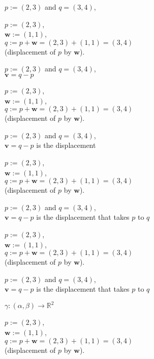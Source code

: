 \documentclass[twocolumn,20pt,fleqn]{extarticle}
\newcommand{\sep}{\vspace{0.5cm}}
\theoremstyle{plain}
\theoremstyle{definition}
\theoremstyle{remark}
\begin{document}
\sep
$p := (2,3)$ and $q=(3,4)$,


\clearpage



$p := (2,3)$,\\ $\mathbf{w} := (1,1)$,\\ $q:=p + \mathbf{w} = (2,3) + (1,1) = (3,4)$ \\ (displacement of $p$ by $\mathbf{w}$).

\sep
$p := (2,3)$ and $q=(3,4)$,\\
$\mathbf{v}= q - p$


\clearpage



$p := (2,3)$,\\ $\mathbf{w} := (1,1)$,\\ $q:=p + \mathbf{w} = (2,3) + (1,1) = (3,4)$ \\ (displacement of $p$ by $\mathbf{w}$).

\sep
$p := (2,3)$ and $q=(3,4)$,\\
$\mathbf{v}= q - p$ is the displacement


\clearpage



$p := (2,3)$,\\ $\mathbf{w} := (1,1)$,\\ $q:=p + \mathbf{w} = (2,3) + (1,1) = (3,4)$ \\ (displacement of $p$ by $\mathbf{w}$).

\sep
$p := (2,3)$ and $q=(3,4)$,\\
$\mathbf{v}= q - p$ is the displacement that takes $p$ to $q$ 



\clearpage



$p := (2,3)$,\\ $\mathbf{w} := (1,1)$,\\ $q:=p + \mathbf{w} = (2,3) + (1,1) = (3,4)$ \\ (displacement of $p$ by $\mathbf{w}$).

\sep
$p := (2,3)$ and $q=(3,4)$,\\
$\mathbf{v}= q - p$ is the displacement that takes $p$ to $q$ 
\sep

$\gamma : (\alpha,\beta) \to \mathbb{R}^2$


\clearpage



$p := (2,3)$,\\ $\mathbf{w} := (1,1)$,\\ $q:=p + \mathbf{w} = (2,3) + (1,1) = (3,4)$ \\ (displacement of $p$ by $\mathbf{w}$).
\end{document}
